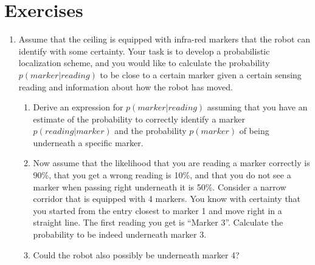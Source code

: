 \section*{Exercises}\small
\begin{enumerate}
\item Assume that the ceiling is equipped with infra-red markers that the robot can identify with some certainty. Your task is to develop a probabilistic localization scheme, and you would like to calculate the probability $p(marker|reading)$ to be close to a certain marker given a certain sensing reading and information about how the robot has moved.
\begin{enumerate}
\item Derive an expression for $p(marker|reading)$ assuming that you have an estimate of the probability to correctly identify a marker $p(reading|marker)$ and the probability $p(marker)$ of being underneath a specific marker. 
\item Now assume that the likelihood that you are reading a marker correctly is 90\%, that you get a wrong reading is 10\%, and that you do not see a marker when passing right underneath it is 50\%. Consider a narrow corridor that is equipped with 4 markers. You know with certainty that you started from the entry closest to marker 1 and move right in a straight line. The first reading you get is ``Marker 3''. Calculate the probability to be indeed underneath marker 3.
\item Could the robot also possibly be underneath marker 4?
\end{enumerate}
\end{enumerate}\normalsize